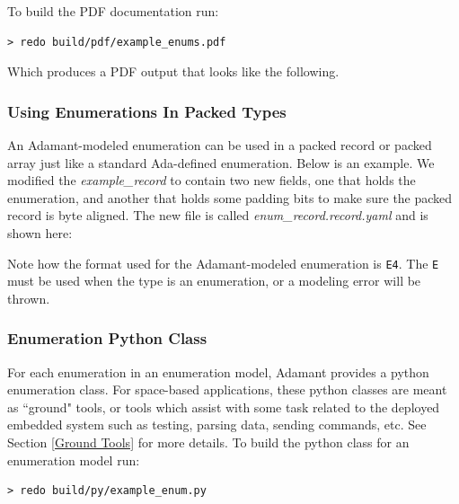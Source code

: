 To build the PDF documentation run:

\vspace{5mm} %
\begin{verbatim}
> redo build/pdf/example_enums.pdf
\end{verbatim}
\vspace{5mm} %

Which produces a PDF output that looks like the following. \\

\noindent\makebox[\linewidth]{\rule{\textwidth}{0.4pt}}

\noindent\makebox[\linewidth]{\rule{\textwidth}{0.4pt}}

\subsubsection{Using Enumerations In Packed Types}

An Adamant-modeled enumeration can be used in a packed record or packed array just like a standard Ada-defined enumeration. Below is an example. We modified the \textit{example\_record} to contain two new fields, one that holds the enumeration, and another that holds some padding bits to make sure the packed record is byte aligned. The new file is called \textit{enum\_record.record.yaml} and is shown here:


Note how the format used for the Adamant-modeled enumeration is \texttt{E4}. The \texttt{E} must be used when the type is an enumeration, or a modeling error will be thrown.

\subsubsection{Enumeration Python Class}

For each enumeration in an enumeration model, Adamant provides a python enumeration class. For space-based applications, these python classes are meant as ``ground" tools, or tools which assist with some task related to the deployed embedded system such as testing, parsing data, sending commands, etc. See Section \ref{Ground Tools} for more details. To build the python class for an enumeration model run:

\vspace{5mm} %
\begin{verbatim}
> redo build/py/example_enum.py
\end{verbatim}
\vspace{5mm} %

